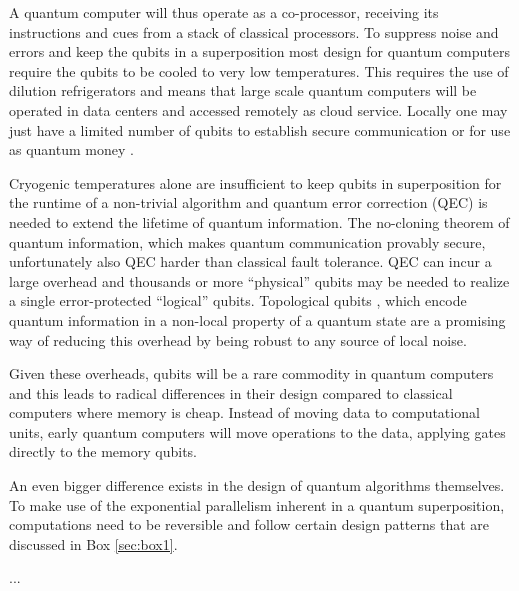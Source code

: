\documentclass[journal]{IEEEtran}
\begin{document}
A quantum computer will thus operate as a co-processor, receiving its instructions and cues from a stack of classical processors. To suppress noise and errors and keep the qubits in a superposition most design for quantum computers require the qubits to be cooled to very low temperatures. This requires the use of dilution refrigerators and means that large scale quantum computers will be operated in data centers and accessed remotely as cloud service. Locally one may just have a limited number of qubits to establish secure communication or for use as quantum money .

Cryogenic temperatures alone are insufficient to keep qubits in superposition for the runtime of a non-trivial algorithm and quantum error correction (QEC) \cite{qec} is needed to extend the lifetime of quantum information. The no-cloning theorem of quantum information, which makes quantum communication provably secure, unfortunately also QEC harder than classical fault tolerance. QEC can incur a large overhead and thousands or more ``physical'' qubits may be needed to realize a single error-protected ``logical'' qubits. Topological qubits \cite{tqc}, which  encode  quantum information in a non-local property of a quantum state are a promising way of reducing this overhead by being robust to any source of local noise. 

Given these overheads, qubits will be a rare commodity in quantum computers and this leads to radical differences in their design compared  to classical computers where memory is cheap. Instead of moving data to computational units, early quantum computers will move operations to the data, applying gates directly to the memory qubits.

 An even bigger difference exists in the design of quantum algorithms themselves. To make use of the  exponential parallelism inherent in a quantum superposition, computations need to be reversible and follow certain design patterns that are discussed in Box \ref{sec:box1}. 




 
% 
% 
% 
% 
 ... 
\end{document}

